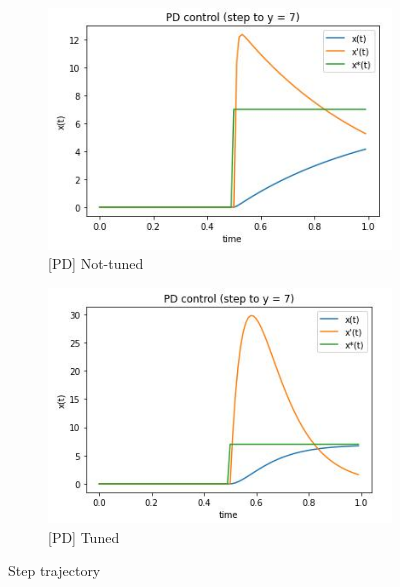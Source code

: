 \documentclass[12pt,letterpaper]{article}
\begin{document}
    \begin{figure}[htb]
        \begin{subfigure}{.5\textwidth}
            \centering
            \includegraphics[width=1\linewidth]{images/output/300_150_0-S7.jpg}
            \caption{[PD] Not-tuned}
        \end{subfigure}
        \begin{subfigure}{.5\textwidth}
          \centering
          \includegraphics[width=1\linewidth]{images/output/143_12_0-S7.jpg}
          \caption{[PD] Tuned}
        \end{subfigure}
    \caption{Step trajectory}
    \label{fig:PD_step}
    \end{figure}
    
\end{document}
